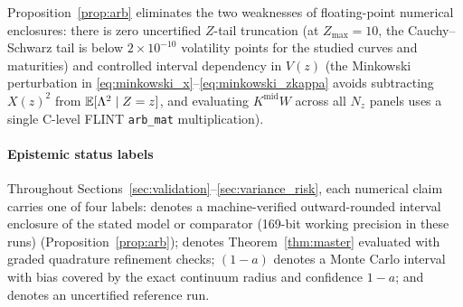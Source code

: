 Proposition~\ref{prop:arb} eliminates the two weaknesses of floating-point numerical enclosures: there is
zero uncertified $Z$-tail truncation (at $Z_{\max}=10$, the Cauchy--Schwarz tail is below
$2\times10^{-10}$ volatility points for the studied curves and maturities) and controlled interval dependency in $V(z)$ (the Minkowski
perturbation in \eqref{eq:minkowski_x}--\eqref{eq:minkowski_zkappa} avoids subtracting $X(z)^2$ from
$\mathbb{E}[\Lambda^2\mid Z=z]$, and evaluating $K^{\mathrm{mid}} W$ across all $N_z$ panels uses a single C-level
FLINT \texttt{arb\_mat} multiplication).

\paragraph{Epistemic status labels} Throughout Sections~\ref{sec:validation}--\ref{sec:variance_risk},
each numerical claim carries one of four labels:  denotes a machine-verified
outward-rounded interval enclosure of the stated model or comparator (169-bit working precision in these runs) (Proposition~\ref{prop:arb});
 denotes Theorem~\ref{thm:master} evaluated with graded quadrature
refinement checks; $(1-a)$ denotes a Monte Carlo interval with bias covered by the exact
continuum radius and confidence $1-a$; and  denotes an uncertified reference run.
